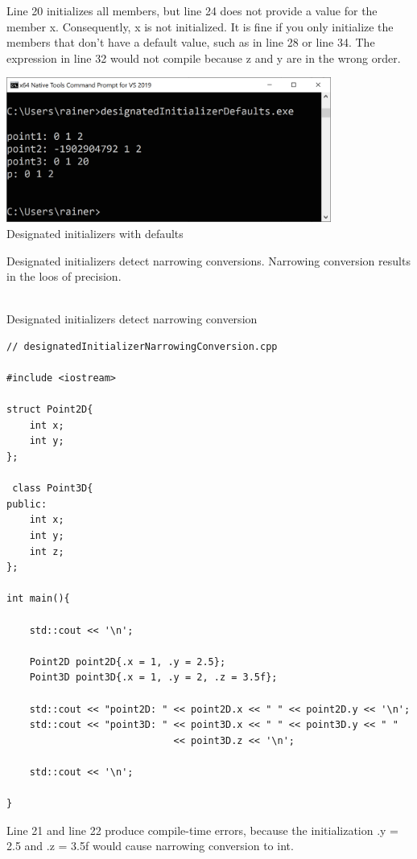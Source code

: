 Line 20 initializes all members, but line 24 does not provide a value for the member x. Consequently, x is not initialized. It is fine if you only initialize the members that don’t have a default value, such as in line 28 or line 34. The expression in line 32 would not compile because z and y are in the wrong order.

\begin{center}
\includegraphics[width=0.8\textwidth]{content/3/chapter4/images/34.png}\\
Designated initializers with defaults
\end{center}

Designated initializers detect narrowing conversions. Narrowing conversion results in the loos of precision.

\hspace*{\fill} \\ %
\noindent
Designated initializers detect narrowing conversion
\begin{lstlisting}[style=styleCXX]
// designatedInitializerNarrowingConversion.cpp

#include <iostream>

struct Point2D{
	int x;
	int y;
};

 class Point3D{
public:
	int x;
	int y;
	int z;
};

int main(){
	
	std::cout << '\n';
	
	Point2D point2D{.x = 1, .y = 2.5};
	Point3D point3D{.x = 1, .y = 2, .z = 3.5f};
	
	std::cout << "point2D: " << point2D.x << " " << point2D.y << '\n';
	std::cout << "point3D: " << point3D.x << " " << point3D.y << " "
							 << point3D.z << '\n';
	
	std::cout << '\n';

}
\end{lstlisting}

Line 21 and line 22 produce compile-time errors, because the initialization .y = 2.5 and .z = 3.5f would cause narrowing conversion to int.

